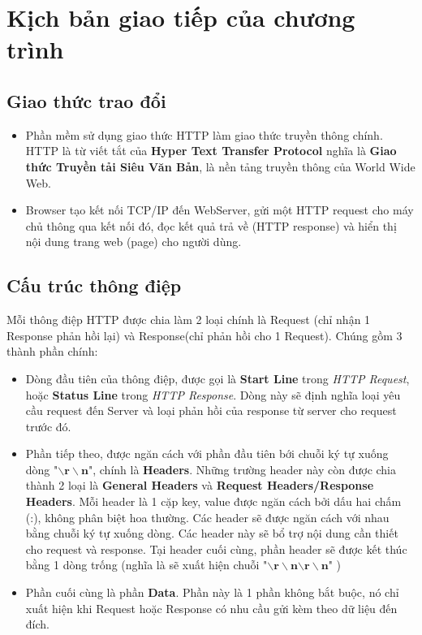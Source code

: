 \documentclass[14pt, a4paper]{extarticle}
\begin{document}
\section{Kịch bản giao tiếp của chương trình}
\subsection{Giao thức trao đổi}
\begin{itemize}
    \item Phần mềm sử dụng giao thức HTTP làm giao thức truyền thông chính. HTTP là từ viết tắt của \textbf{Hyper Text Transfer Protocol} nghĩa là \textbf{Giao thức Truyền tải Siêu Văn Bản}, là nền tảng truyền thông của World Wide Web.
    \item Browser tạo kết nối TCP/IP đến WebServer, gửi một HTTP request cho máy chủ thông qua kết nối đó, đọc kết quả trả về (HTTP response) và hiển thị nội dung trang web (page) cho người dùng.
\end{itemize}
\subsection{Cấu trúc thông điệp}
Mỗi thông điệp HTTP được chia làm 2 loại chính là Request (chỉ nhận 1 Response phản hồi lại) và Response(chỉ phản hồi cho 1 Request). Chúng gồm 3 thành phần chính:
\begin{itemize}
    \item Dòng đầu tiên của thông điệp, được gọi là \textbf{Start Line} trong \textit{HTTP Request}, hoặc \textbf{Status Line} trong \textit{HTTP Response}. Dòng này sẽ định nghĩa loại yêu cầu request đến Server và loại phản hồi của response từ server cho request trước đó.
    \item Phần tiếp theo, được ngăn cách với phần đầu tiên bới chuỗi ký tự xuống dòng "$\bm{\backslash r \backslash n}$", chính là \textbf{Headers}. Những trường header này còn được chia thành 2 loại là \textbf{General Headers} và \textbf{Request Headers/Response Headers}. Mỗi header là 1 cặp key, value được ngăn cách bởi dấu hai chấm (:), không phân biệt hoa thường. Các header sẽ được ngăn cách với nhau bằng chuỗi ký tự xuống dòng. Các header này sẽ bổ trợ nội dung cần thiết cho request và response. Tại header cuối cùng, phần header sẽ được kết thúc bằng 1 dòng trống (nghĩa là sẽ xuất hiện chuỗi "$\bm{\backslash r \backslash n}\bm{\backslash r \backslash n}$"
    )
    \item Phần cuối cùng là phần \textbf{Data}. Phần này là 1 phần không bắt buộc, nó chỉ xuất hiện khi Request hoặc Response có nhu cầu gửi kèm theo dữ liệu đến đích.
\end{itemize}
\end{document}
